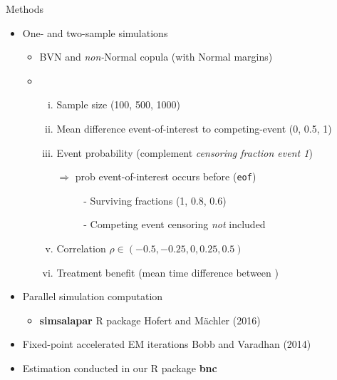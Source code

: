 
\begin{frame}[fragile]{Methods}
\protect\hypertarget{methods}{}

\begin{itemize}
\tightlist
\item
  One- and two-sample simulations

  \begin{itemize}
  \tightlist
  \item BVN and \emph{non-}Normal copula  (with Normal margins)
  \item
    {\color{DarkBlue}{Parameters varying}}

    \begin{enumerate}
    [i.]
    \tightlist
    \item
      Sample size (100, 500, 1000)  
    \item
      Mean difference event-of-interest to competing-event (0, 0.5, 1)
    \item
      Event probability (complement \emph{censoring fraction event 1}) 
      \item[]$\Rightarrow$ prob event-of-interest occurs before {\color{DarkBlue}{end of study}} (\texttt{eof})
        \begin{itemize}
        \tightlist
        \item[~~-]
          Surviving fractions (1, 0.8, 0.6)
        \item[~~-]
          Competing event censoring \emph{not} included
        \end{itemize}
    \item
      \alert{Correlation} \(\rho \in (-0.5,-0.25, 0, 0.25, 0.5)\)
    \item
      \alert{Treatment benefit} (mean time difference between {})
    \end{enumerate} %
  \end{itemize}

\item
  Parallel simulation computation
  \begin{itemize}
  \tightlist
  \item
    \textbf{simsalapar} R package Hofert and Mächler (2016)
  \end{itemize}

\item
  Fixed-point accelerated EM iterations Bobb and Varadhan (2014)
\item
  Estimation conducted in our R package \textbf{bnc}
\end{itemize}

\end{frame}